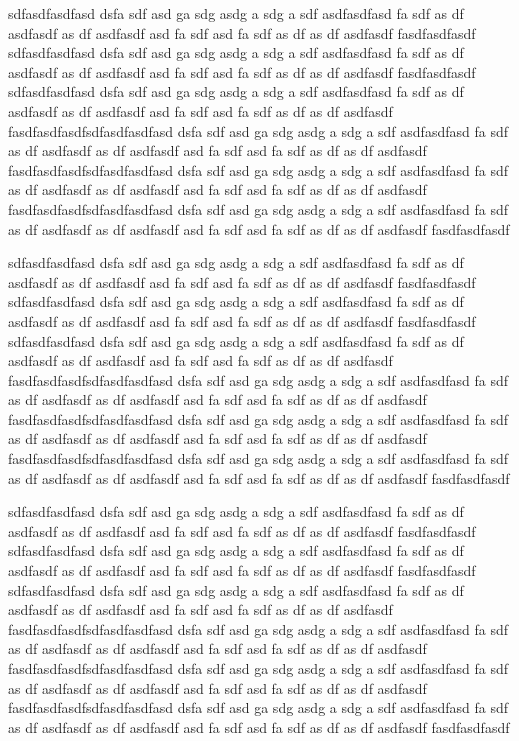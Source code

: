 \documentclass[12pt,a4paper]{article}
\begin{document}
\begin{multicols}{3}
sdfasdfasdfasd dsfa sdf asd ga sdg asdg a sdg a sdf asdfasdfasd fa sdf as df asdfasdf as df asdfasdf asd fa sdf asd fa sdf as df as df asdfasdf
fasdfasdfasdf
sdfasdfasdfasd dsfa sdf asd ga sdg asdg a sdg a sdf asdfasdfasd fa sdf as df asdfasdf as df asdfasdf asd fa sdf asd fa sdf as df as df asdfasdf
fasdfasdfasdf
sdfasdfasdfasd dsfa sdf asd ga sdg asdg a sdg a sdf asdfasdfasd fa sdf as df asdfasdf as df asdfasdf asd fa sdf asd fa sdf as df as df asdfasdf
fasdfasdfasdfsdfasdfasdfasd dsfa sdf asd ga sdg asdg a sdg a sdf asdfasdfasd fa sdf as df asdfasdf as df asdfasdf asd fa sdf asd fa sdf as df as df asdfasdf
fasdfasdfasdfsdfasdfasdfasd dsfa sdf asd ga sdg asdg a sdg a sdf asdfasdfasd fa sdf as df asdfasdf as df asdfasdf asd fa sdf asd fa sdf as df as df asdfasdf
fasdfasdfasdfsdfasdfasdfasd dsfa sdf asd ga sdg asdg a sdg a sdf asdfasdfasd fa sdf as df asdfasdf as df asdfasdf asd fa sdf asd fa sdf as df as df asdfasdf
fasdfasdfasdf

sdfasdfasdfasd dsfa sdf asd ga sdg asdg a sdg a sdf asdfasdfasd fa sdf as df asdfasdf as df asdfasdf asd fa sdf asd fa sdf as df as df asdfasdf
fasdfasdfasdf
sdfasdfasdfasd dsfa sdf asd ga sdg asdg a sdg a sdf asdfasdfasd fa sdf as df asdfasdf as df asdfasdf asd fa sdf asd fa sdf as df as df asdfasdf
fasdfasdfasdf
sdfasdfasdfasd dsfa sdf asd ga sdg asdg a sdg a sdf asdfasdfasd fa sdf as df asdfasdf as df asdfasdf asd fa sdf asd fa sdf as df as df asdfasdf
fasdfasdfasdfsdfasdfasdfasd dsfa sdf asd ga sdg asdg a sdg a sdf asdfasdfasd fa sdf as df asdfasdf as df asdfasdf asd fa sdf asd fa sdf as df as df asdfasdf
fasdfasdfasdfsdfasdfasdfasd dsfa sdf asd ga sdg asdg a sdg a sdf asdfasdfasd fa sdf as df asdfasdf as df asdfasdf asd fa sdf asd fa sdf as df as df asdfasdf
fasdfasdfasdfsdfasdfasdfasd dsfa sdf asd ga sdg asdg a sdg a sdf asdfasdfasd fa sdf as df asdfasdf as df asdfasdf asd fa sdf asd fa sdf as df as df asdfasdf
fasdfasdfasdf

sdfasdfasdfasd dsfa sdf asd ga sdg asdg a sdg a sdf asdfasdfasd fa sdf as df asdfasdf as df asdfasdf asd fa sdf asd fa sdf as df as df asdfasdf
fasdfasdfasdf
sdfasdfasdfasd dsfa sdf asd ga sdg asdg a sdg a sdf asdfasdfasd fa sdf as df asdfasdf as df asdfasdf asd fa sdf asd fa sdf as df as df asdfasdf
fasdfasdfasdf
sdfasdfasdfasd dsfa sdf asd ga sdg asdg a sdg a sdf asdfasdfasd fa sdf as df asdfasdf as df asdfasdf asd fa sdf asd fa sdf as df as df asdfasdf
fasdfasdfasdfsdfasdfasdfasd dsfa sdf asd ga sdg asdg a sdg a sdf asdfasdfasd fa sdf as df asdfasdf as df asdfasdf asd fa sdf asd fa sdf as df as df asdfasdf
fasdfasdfasdfsdfasdfasdfasd dsfa sdf asd ga sdg asdg a sdg a sdf asdfasdfasd fa sdf as df asdfasdf as df asdfasdf asd fa sdf asd fa sdf as df as df asdfasdf
fasdfasdfasdfsdfasdfasdfasd dsfa sdf asd ga sdg asdg a sdg a sdf asdfasdfasd fa sdf as df asdfasdf as df asdfasdf asd fa sdf asd fa sdf as df as df asdfasdf
fasdfasdfasdf


\end{multicols}
\end{document}
